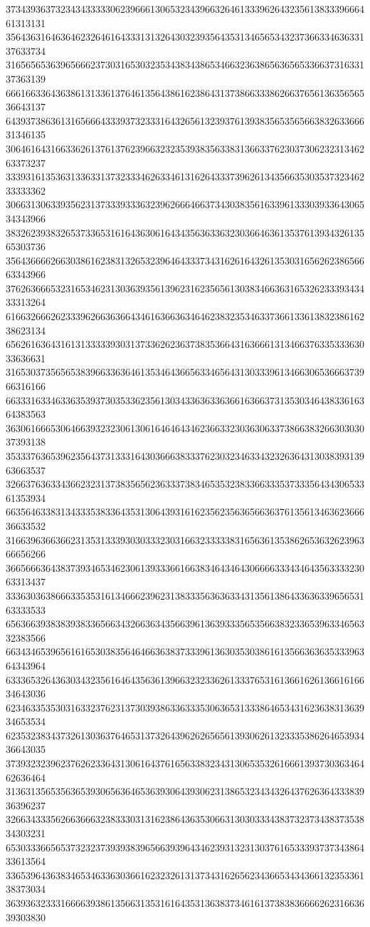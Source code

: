 37343936373234343333306239666130653234396632646133396264323561383339666461313131
35643631646364623264616433313132643032393564353134656534323736633463633137633734
31656565363965666237303165303235343834386534663236386563656533663731633137363139
66616633643638613133613764613564386162386431373866333862663765613635656536643137
64393738636131656664333937323331643265613239376139383565356566383263366631346135
30646164316633626137613762396632323539383563383136633762303730623231346263373237
33393161353631336331373233346263346131626433373962613435663530353732346233333362
30663130633935623137333933363239626664663734303835616339613330393364306534343966
38326239383265373365316164363061643435636336323036646361353761393432613565303736
35643666626630386162383132653239646433373431626164326135303165626238656663343966
37626366653231653462313036393561396231623565613038346636316532623339343433313264
61663266626233396266363664346163663634646238323534633736613361383238616238623134
65626163643161313333393031373362623637383536643163666131346637633533363033636631
31653037356565383966336364613534643665633465643130333961346630653666373966316166
66333163346336353937303533623561303433636336366163663731353034643833616364383563
36306166653064663932323061306164646434623663323036306337386638326630303037393138
35333763653962356437313331643036663833376230323463343232636431303839313963663537
32663763633436623231373835656236333738346535323833663335373335643430653361353934
66356463383134333538336435313064393161623562356365663637613561346362366636633532
31663963663662313531333930303332303166323333383165636135386265363262396366656266
36656663643837393465346230613933366166383464346430666633343464356333323063313437
33363036386663353531613466623962313833356363633431356138643363633965653163333533
65636639383839383365663432663634356639613639333565356638323365396334656332383566
66343465396561616530383564646636383733396136303530386161356636363533396364343964
63336532643630343235616464356361396632323362613337653161366162613661616634643036
62346335353031633237623137303938633633353063653133386465343162363831363934653534
62353238343732613036376465313732643962626565613930626132333538626465393436643035
37393232396237626233643130616437616563383234313065353261666139373036346462636464
31363135653563653930656364653639306439306231386532343432643762636433383936396237
32663433356266366632383330313162386436353066313030333438373237343837353834303231
65303336656537323237393938396566393964346239313231303761653339373734386433613564
33653964363834653463363036616232326131373431626562343665343436613235336138373034
36393632333166663938613566313531616435313638373461613738383666626231663639303830

